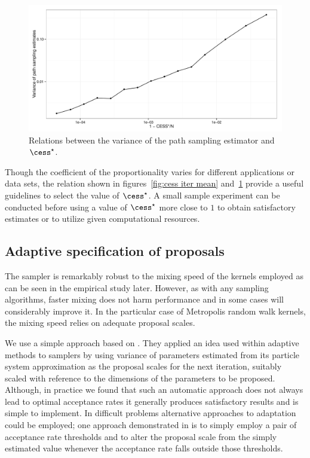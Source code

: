 \begin{figure}[t]
  \includegraphics[width=\linewidth]{fig/CESS_Path_Var}
  \caption[Relations between the variance of the path sampling estimator and
  \protect\cess]
  {Relations between the variance of the path sampling estimator and
    $\cess^\star$.}
  \label{fig:cess path var}
\end{figure}

Though the coefficient of the proportionality varies for different
applications or data sets, the relation shown in figures~\ref{fig:cess iter
  mean} and~\ref{fig:cess path var} provide a useful guidelines to select the
value of $\cess^\star$. A small sample experiment can be conducted before using a
value of $\cess^\star$ more close to $1$ to obtain satisfactory estimates or to
utilize given computational resources.

\subsection{Adaptive specification of proposals}
\label{sub:Adaptive specification of proposals}

The \smc sampler is remarkably robust to the mixing speed of the \mcmc kernels
employed as can be seen in the empirical study later. However, as with any
sampling algorithms, faster mixing does not harm performance and in some cases
will considerably improve it. In the particular case of Metropolis random walk
kernels, the mixing speed relies on adequate proposal scales.

We use a simple approach based on \cite{Jasra:2010eh}. They applied an idea
used within adaptive \mcmc methods \cite{Andrieu:2006tw} to \smc samplers by
using variance of parameters estimated from its particle system approximation
as the proposal scales for the next iteration, suitably scaled with reference
to the dimensions of the parameters to be proposed. Although, in practice we
found that such an automatic approach does not always lead to optimal
acceptance rates it generally produces satisfactory results and is simple to
implement. In difficult problems alternative approaches to adaptation could be
employed; one approach demonstrated in \cite{Jasra:2010eh} is to simply employ
a pair of acceptance rate thresholds and to alter the proposal scale from the
simply estimated value whenever the acceptance rate falls outside those
thresholds.

